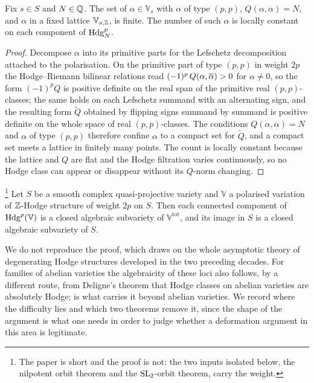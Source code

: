 \begin{lemma}\label{lem:boundednorm}
Fix $s\in S$ and $N\in\mathbb{Q}$. The set of $\alpha\in\mathbb{V}_{s}$ with
$\alpha$ of type $(p,p)$, $Q(\alpha,\alpha)=N$, and $\alpha$ in a fixed
lattice $\mathbb{V}_{s,\mathbb{Z}}$, is finite. The number of such $\alpha$ is locally
constant on each component of $\mathrm{Hdg}^{p}_{N}$.
\end{lemma}

\begin{proof}
Decompose $\alpha$ into its primitive parts for the Lefschetz decomposition
attached to the polarisation. On the primitive part of type $(p,p)$ in weight
$2p$ the Hodge--Riemann bilinear relations read
$(-1)^{p}\,Q(\alpha,\overline{\alpha})>0$ for $\alpha\ne0$, so the form
$(-1)^{p}Q$ is positive definite on the real span of the primitive real
$(p,p)$-classes; the same holds on each Lefschetz summand with an alternating
sign, and the resulting form $\tilde Q$ obtained by flipping signs summand by
summand is positive definite on the whole space of real $(p,p)$-classes. The
conditions $Q(\alpha,\alpha)=N$ and $\alpha$ of type $(p,p)$ therefore confine
$\alpha$ to a compact set for $\tilde Q$, and a compact set meets a lattice in
finitely many points. The count is locally constant because the lattice and $Q$
are flat and the Hodge filtration varies continuously, so no Hodge class can
appear or disappear without its $Q$-norm changing.
\end{proof}

\begin{theorem}\label{thm:cdk}%
\footnote{The paper is short and the proof is not: the two inputs isolated
below, the nilpotent orbit theorem and the $\operatorname{SL}_{2}$-orbit theorem, carry the
weight.}
Let $S$ be a smooth complex quasi-projective variety and $\mathbb{V}$ a
polarised variation of $\mathbb{Z}$-Hodge structure of weight $2p$ on $S$. Then each
connected component of $\mathrm{Hdg}^{p}(\mathbb{V})$ is a closed algebraic subvariety
of $\mathbb{V}^{\mathrm{tot}}$, and its image in $S$ is a closed algebraic
subvariety of $S$.
\end{theorem}

We do not reproduce the proof, which draws on the whole asymptotic theory of
degenerating Hodge structures developed in the two preceding decades. For
families of abelian varieties the algebraicity of these loci also follows, by
a different route, from Deligne's theorem that Hodge classes on abelian
varieties are absolutely Hodge;  is what carries it beyond
abelian varieties. We record where the difficulty lies and which two
theorems remove it, since the shape of the argument is what one needs in
order to judge whether a deformation argument in this area is legitimate.

